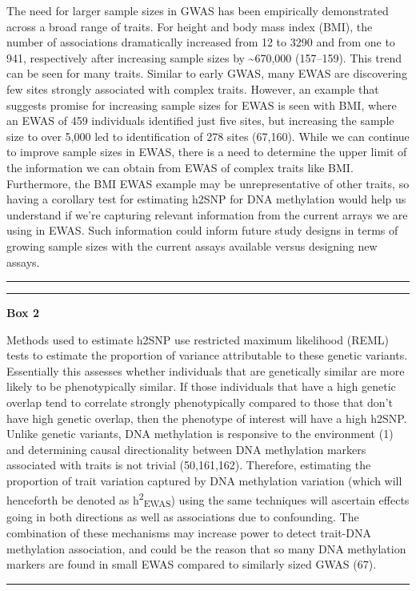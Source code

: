 \documentclass[11pt,oneside]{bristolthesis}
\begin{document}
The need for larger sample sizes in GWAS has been empirically demonstrated across a broad range of traits. For height and body mass index (BMI), the number of associations dramatically increased from 12 to 3290 and from one to 941, respectively after increasing sample sizes by \textasciitilde670,000 (157--159). This trend can be seen for many traits. Similar to early GWAS, many EWAS are discovering few sites strongly associated with complex traits. However, an example that suggests promise for increasing sample sizes for EWAS is seen with BMI, where an EWAS of 459 individuals identified just five sites, but increasing the sample size to over 5,000 led to identification of 278 sites (67,160). While we can continue to improve sample sizes in EWAS, there is a need to determine the upper limit of the information we can obtain from EWAS of complex traits like BMI. Furthermore, the BMI EWAS example may be unrepresentative of other traits, so having a corollary test for estimating h2SNP for DNA methylation would help us understand if we're capturing relevant information from the current arrays we are using in EWAS. Such information could inform future study designs in terms of growing sample sizes with the current assays available versus designing new assays.
\begin{center}\rule{0.5\linewidth}{0.5pt}\end{center}
\begin{center}\rule{0.5\linewidth}{0.5pt}\end{center}

\textbf{Box 2}

Methods used to estimate h2SNP use restricted maximum likelihood (REML) tests to estimate the proportion of variance attributable to these genetic variants. Essentially this assesses whether individuals that are genetically similar are more likely to be phenotypically similar. If those individuals that have a high genetic overlap tend to correlate strongly phenotypically compared to those that don't have high genetic overlap, then the phenotype of interest will have a high h2SNP. Unlike genetic variants, DNA methylation is responsive to the environment (1) and determining causal directionality between DNA methylation markers associated with traits is not trivial (50,161,162). Therefore, estimating the proportion of trait variation captured by DNA methylation variation (which will henceforth be denoted as h\textsuperscript{2}\textsubscript{EWAS}) using the same techniques will ascertain effects going in both directions as well as associations due to confounding. The combination of these mechanisms may increase power to detect trait-DNA methylation association, and could be the reason that so many DNA methylation markers are found in small EWAS compared to similarly sized GWAS (67).
\begin{center}\rule{0.5\linewidth}{0.5pt}\end{center}
\end{document}
